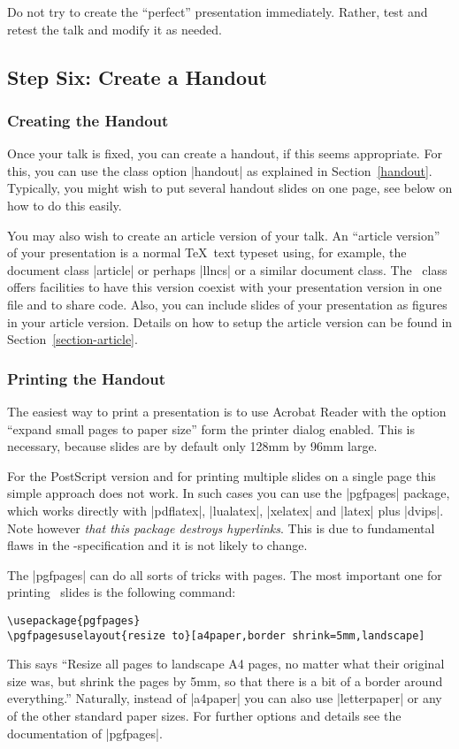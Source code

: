 Do not try to create the ``perfect'' presentation immediately. Rather, test and retest the talk and modify it as needed.


\subsection{Step Six: Create a Handout}

\subsubsection{Creating the Handout}

Once your talk is fixed, you can create a handout, if this seems appropriate. For this, you can use the class option |handout| as explained in Section~\ref{handout}. Typically, you might wish to put several handout slides on one page, see below on how to do this easily.

You may also wish to create an article version of your talk. An ``article version'' of your presentation is a normal \TeX\ text typeset using, for example, the document class |article| or perhaps |llncs| or a similar document class. The \beamer\ class offers facilities to have this version coexist with your presentation version in one file and to share code. Also, you can include slides of your presentation as figures in your article version. Details on how to setup the article version can be found in Section~\ref{section-article}.

\subsubsection{Printing the Handout}
\label{section-printing-version}

The easiest way to print a presentation is to use Acrobat Reader with the option ``expand small pages to paper size'' form the printer dialog enabled. This is necessary, because slides are by default only 128mm by 96mm large.

For the PostScript version and for printing multiple slides on a single page this simple approach does not work. In such cases you can use the |pgfpages| package, which works directly with |pdflatex|, |lualatex|, |xelatex| and |latex| plus |dvips|. Note however \emph{that this package destroys hyperlinks}. This is due to fundamental flaws in the \pdf-specification and it is not likely to change.

The |pgfpages| can do all sorts of tricks with pages. The most important one for printing \beamer\ slides is the following command:
\begin{verbatim}
\usepackage{pgfpages}
\pgfpagesuselayout{resize to}[a4paper,border shrink=5mm,landscape]
\end{verbatim}
This says ``Resize all pages to landscape A4 pages, no matter what their original size was, but shrink the pages by 5mm, so that there is a bit of a border around everything.'' Naturally, instead of |a4paper| you can also use |letterpaper| or any of the other standard paper sizes. For further options and details see the documentation of |pgfpages|.

